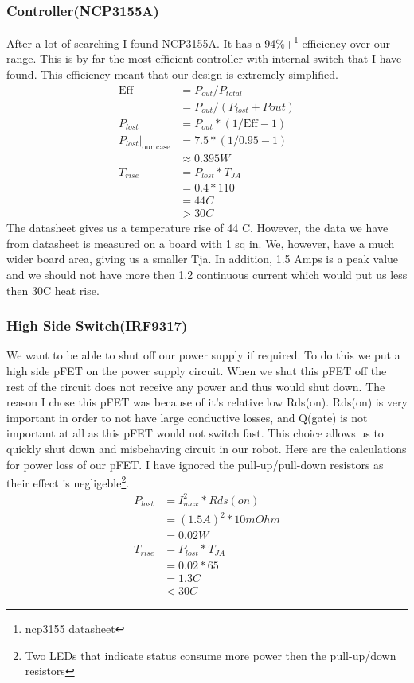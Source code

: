 \documentclass[12pt]{article}
\begin{document}
\subsubsection{Controller(NCP3155A)}
After a lot of searching I found NCP3155A. It has a 94\%+\footnote{ncp3155 datasheet} efficiency over our range. This is by far the most efficient controller with internal switch that I have found. This efficiency meant that our design is extremely simplified.
\begin{align}
\text{Eff} &= P_{out} / P_{total}
\\&= P_{out} / (P_{lost} + P{out})
\\ P_{lost} &= P_{out} * (1/\text{Eff} - 1)
\\ P_{lost}|_{\text{our case}} &=  7.5 * (1/0.95 -1)
\\ &\approx 0.395 W
\\ T_{rise} &= P_{lost} * T_{JA}
\\  &= 0.4 * 110
\\  &= 44 C
\\ &>30C
\end{align}
The datasheet gives us a temperature rise of 44 C. However, the data we have from datasheet is measured on a board with 1 sq in. We, however, have a much wider board area, giving us a smaller Tja. In addition, 1.5 Amps is a peak value and we should not have more then 1.2 continuous current which would put us less then 30C heat rise. 
\subsubsection{High Side Switch(IRF9317)}
We want to be able to shut off our power supply if required. To do this we put a high side pFET on the power supply circuit. When we shut this pFET off the rest of the circuit does not receive any power and thus would shut down. The reason I chose this pFET was because of it's relative low Rds(on). Rds(on) is very important in order to not have large conductive losses, and Q(gate) is not important at all as this pFET would not switch fast. This choice allows us to quickly shut down and misbehaving circuit in our robot. Here are the calculations for power loss of our pFET. I have ignored the pull-up/pull-down resistors as their effect is negligeble\footnote{Two LEDs that indicate status consume more power then the pull-up/down resistors}.
\begin{align}
P_{lost} &= I_{max}^{2} * Rds(on)
\\&=(1.5 A)^{2} * 10 mOhm
\\&=0.02 W
\\T_{rise}&= P_{lost} * T_{JA}
\\&=0.02 * 65
\\&= 1.3 C
\\&<30C
\end{align}
\end{document}
